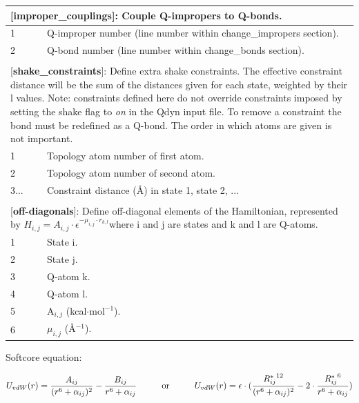 \documentclass[a4paper,12pt]{article}
\begin{document}
\begin{longtable}{|p{53pt}|p{181pt}|p{160pt}|}
\multicolumn{3}{p{394pt}}{[\textbf{improper\_couplings}]: Couple Q-impropers to Q-bonds.}\\
\hline 1 & \multicolumn{2}{p{341pt}|}{Q-improper number (line number within change\_impropers section).}\\
\hline 2 & \multicolumn{2}{p{341pt}|}{Q-bond number (line number within change\_bonds section).}\\
\hline
\multicolumn{3}{p{394pt}}{}\\

\multicolumn{3}{p{394pt}}{[\textbf{shake\_constraints}]: Define extra shake constraints. The effective constraint distance will be the sum of the distances given for each state, weighted by their l values. Note: constraints defined here do not override constraints imposed by setting the shake flag to \emph{on} in the Qdyn input file. To remove a constraint the bond must be redefined as a Q-bond. The order in which atoms are given is not important.}\\
\hline 1 & \multicolumn{2}{p{341pt}|}{Topology atom number of first atom.}\\
\hline 2 & \multicolumn{2}{p{341pt}|}{Topology atom number of second atom.}\\
\hline 3... & \multicolumn{2}{p{341pt}|}{Constraint distance ({\AA}) in state 1, state 2, ...}\\
\hline
\multicolumn{3}{p{394pt}}{}\\

\multicolumn{3}{p{394pt}}{[\textbf{off-diagonals}]: Define off-diagonal elements of the Hamiltonian, represented by $H_{i,j}=A_{i,j}\cdot \epsilon^{-\mu_{i,j}\cdot r_{k,l}}$where i and j are states and k and l are Q-atoms.}\\
\hline 1 & \multicolumn{2}{p{341pt}|}{State i.}\\
\hline 2 & \multicolumn{2}{p{341pt}|}{State j.}\\
\hline 3 & \multicolumn{2}{p{341pt}|}{Q-atom k.}\\
\hline 4 & \multicolumn{2}{p{341pt}|}{Q-atom l.}\\
\hline 5 & \multicolumn{2}{p{341pt}|}{A$_{i,j}$ (kcal$\cdot$mol$^{-1}$).}\\
\hline 6 & \multicolumn{2}{p{341pt}|}{$\mu_{i,j}$ ({\AA}$^{-1}$).}\\
\hline
\end{longtable}
\normalsize

Softcore equation:

\begin {equation}
\label{eq:softcore}
 U_{vdW}(r) = \frac{A_{ij}}{(r^6 + \alpha_{ij})^2} - \frac{B_{ij}}{r^6 +
 \alpha_{ij}}
 \text{\hspace{1cm}or\hspace{1cm}}
 U_{vdW}(r) = \epsilon\cdot(\frac{{R_{ij}^{*}}^{12}}{(r^6 + \alpha_{ij})^2} - 2\cdot\frac{{R_{ij}^{*}}^{6}}{r^6 + \alpha_{ij}})
\end{equation}
\end{document}
